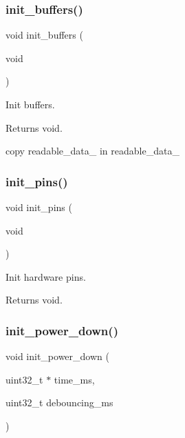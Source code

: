 \subsubsection{\texorpdfstring{init\+\_\+buffers()}{init\_buffers()}}
{\footnotesize\ttfamily void init\+\_\+buffers (\begin{DoxyParamCaption}\item[{void}]{ }\end{DoxyParamCaption})}



Init buffers. 

\begin{DoxyReturn}{Returns}
void. 
\end{DoxyReturn}
copy readable\+\_\+data\+\_ in readable\+\_\+data\+\_ \mbox{\label{i2c-rain_8h_aa9c113540346b54d49b2a596e6ba8480}} 
\subsubsection{\texorpdfstring{init\+\_\+pins()}{init\_pins()}}
{\footnotesize\ttfamily void init\+\_\+pins (\begin{DoxyParamCaption}\item[{void}]{ }\end{DoxyParamCaption})}



Init hardware pins. 

\begin{DoxyReturn}{Returns}
void. 
\end{DoxyReturn}
\mbox{\label{i2c-rain_8h_afb98a0f07c30784284f48271ffe02b97}} 
\subsubsection{\texorpdfstring{init\+\_\+power\+\_\+down()}{init\_power\_down()}}
{\footnotesize\ttfamily void init\+\_\+power\+\_\+down (\begin{DoxyParamCaption}\item[{uint32\+\_\+t $\ast$}]{time\+\_\+ms,  }\item[{uint32\+\_\+t}]{debouncing\+\_\+ms }\end{DoxyParamCaption})}



